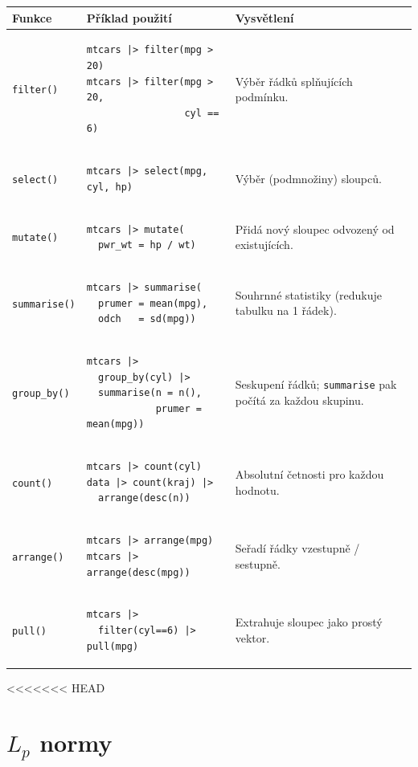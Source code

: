 \documentclass[a4paper, 11pt]{article}
\newenvironment{funkcedict}
{%
  \begingroup
  \renewcommand{\arraystretch}{1.4}%
  \lstset{basicstyle=\ttfamily\small, columns=fullflexible}%
  \setlength{\tabcolsep}{4pt}%
  \begin{tabular}{p{0.19\textwidth} p{0.38\textwidth} p{0.30\textwidth}}
  \textbf{Funkce} & \textbf{Příklad použití} & \textbf{Vysvětlení} \\
  \midrule
}
{%
  \end{tabular}%
  \endgroup
}
\begin{document}
			\begin{funkcedict}
				\texttt{filter()} &
				\begin{lstlisting}
mtcars |> filter(mpg > 20)
mtcars |> filter(mpg > 20,
                 cyl == 6)
				\end{lstlisting}
				& Výběr řádků splňujících podmínku. \\
				\texttt{select()} &
				\begin{lstlisting}
mtcars |> select(mpg, cyl, hp)
				\end{lstlisting}
				& Výběr (podmnožiny) sloupců. \\
				\texttt{mutate()} &
				\begin{lstlisting}
mtcars |> mutate(
  pwr_wt = hp / wt)
				\end{lstlisting}
				& Přidá nový sloupec odvozený od existujících. \\
				\texttt{summarise()} &
				\begin{lstlisting}
mtcars |> summarise(
  prumer = mean(mpg),
  odch   = sd(mpg))
				\end{lstlisting}
				& Souhrnné statistiky (redukuje tabulku na 1 řádek). \\
				\texttt{group\_by()} &
				\begin{lstlisting}
mtcars |>
  group_by(cyl) |>
  summarise(n = n(),
            prumer = mean(mpg))
				\end{lstlisting}
				& Seskupení řádků; \texttt{summarise} pak počítá za každou skupinu. \\
				\texttt{count()} &
				\begin{lstlisting}
mtcars |> count(cyl)
data |> count(kraj) |>
  arrange(desc(n))
				\end{lstlisting}
				& Absolutní četnosti pro každou hodnotu. \\
				\texttt{arrange()} &
				\begin{lstlisting}
mtcars |> arrange(mpg)
mtcars |> arrange(desc(mpg))
				\end{lstlisting}
				& Seřadí řádky vzestupně / sestupně. \\
				\texttt{pull()} &
				\begin{lstlisting}
mtcars |>
  filter(cyl==6) |> pull(mpg)
				\end{lstlisting}
				& Extrahuje sloupec jako prostý vektor. \\
			\end{funkcedict}

<<<<<<< HEAD
\section{$L_p$ normy}
\end{document}
